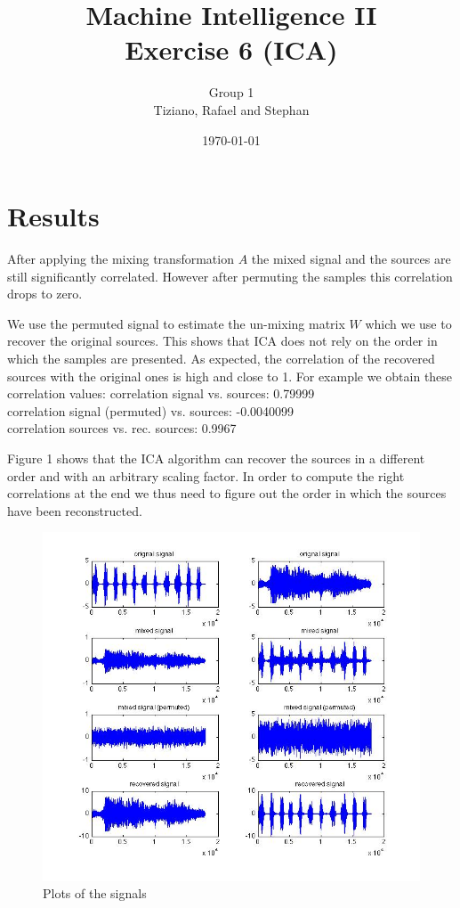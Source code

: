\documentclass[]{article}
\title{Machine Intelligence II \\ Exercise 6 (ICA)}
\author{Group 1 \\ Tiziano, Rafael and Stephan}
\date{\today}
\begin{document}
\ifpdf
{}
\else
{}
\fi

\maketitle

\section{Results}

After applying the mixing transformation $A$ the mixed signal and the sources are still significantly correlated.
However after permuting the samples this correlation drops to zero. 
\par We use the permuted signal to estimate the 
un-mixing matrix $W$ which we use to recover the original sources. This shows that ICA does not rely on the order in which the samples are presented.
As expected, the correlation of the recovered sources with the original ones is high and close to 1.
For example we obtain these correlation values:
correlation signal vs. sources: 0.79999\\
correlation signal (permuted) vs. sources: -0.0040099\\
correlation sources vs. rec. sources: 0.9967\\
\par
Figure 1 shows that the ICA algorithm can recover the sources in a different order and with an arbitrary scaling factor.
In order to compute the right correlations at the end we thus need to figure out the order in which the sources have been reconstructed.

\begin{figure}[h!]
	\centering
		\includegraphics[width=1\textwidth]{sound_plot.jpg}
	\caption{Plots of the signals}
	\label{sg:fig:sound_plot}
\end{figure}
\end{document}
